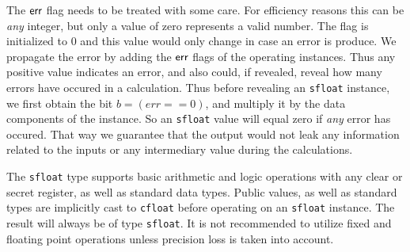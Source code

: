 The $\mathsf{err}$ flag needs to be treated with some care.
For efficiency reasons this can be {\em any} integer, but only
a value of zero represents a valid number.
The flag is initialized to $0$ and this value would only change in case an error is produce. 
We propagate the error by adding the $\mathsf{err}$ flags of the operating instances.
Thus any positive value indicates an error, and also could, if revealed, reveal how
many errors have occured in a calculation.
Thus before revealing an \verb|sfloat| instance, we first obtain the bit $ b = (err == 0)$, 
and multiply it by the data components of the instance. So an \verb|sfloat| value
will equal zero if {\em any} error has occured.
That way we guarantee that the output would not leak any information 
related to the inputs or any intermediary value during the calculations. 

The \verb|sfloat| type supports basic arithmetic and logic operations with 
any clear or secret register, as well as standard data types. 
Public values, as well as standard types are implicitly cast to \verb|cfloat| 
before operating on an \verb|sfloat| instance. The result will always be of type \verb|sfloat|. 
It is not recommended to utilize fixed and floating point operations unless
precision loss is taken into account.
 

